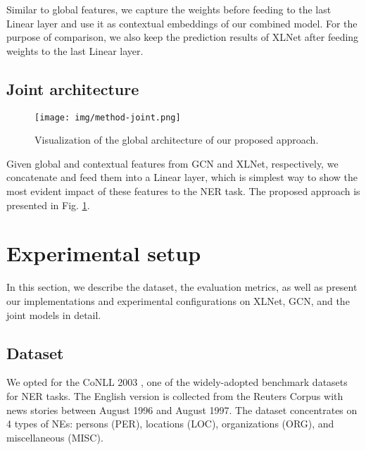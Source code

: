 \documentclass[runningheads]{llncs}
\begin{document}
Similar to global features, we capture the weights before feeding to the last Linear layer and use it as contextual embeddings of our combined model. For the purpose of comparison, we also keep the prediction results of XLNet after feeding weights to the last Linear layer.
\vspace{-0.3cm}
\subsection{Joint architecture}
\begin{figure}[ht]
  \centering
  \texttt{[image: img/method-joint.png]}
  \vspace{-0.3cm}
  \caption{Visualization of the global architecture of our proposed approach.}
  \label{fig:mix}
\end{figure}

Given global and contextual features from GCN and XLNet, respectively, we concatenate and feed them into a Linear layer, which is simplest way to show the most evident impact of these features to the NER task. The proposed approach is presented in Fig. \ref{fig:mix}. 
\vspace{-0.2cm}
\section{Experimental setup}
\label{sec:expe}

In this section, we describe the dataset, the evaluation metrics, as well as present our implementations and experimental configurations on XLNet, GCN, and the joint models in detail. 
\vspace{-0.7cm}
\subsection{Dataset}
We opted for the CoNLL 2003 \cite{tjongkimsang2003conll}, one of the widely-adopted benchmark datasets for NER tasks. The English version is collected from the Reuters Corpus with news stories between August 1996 and August 1997. The dataset concentrates on 4 types of NEs: persons (PER), locations (LOC), organizations (ORG), and miscellaneous (MISC). \vspace{-0.3cm}
\end{document}
